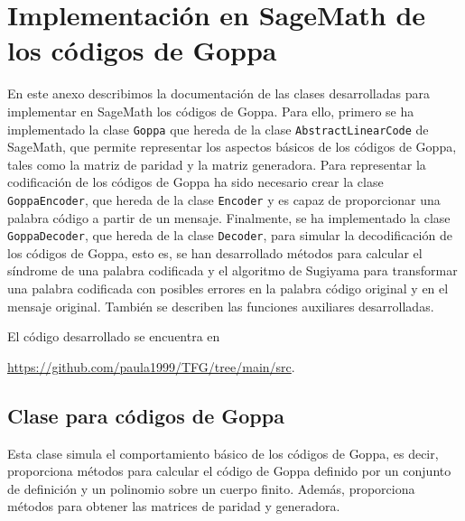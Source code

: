 \newpage
\null
\thispagestyle{empty}

\chapter[Implementación en SageMath de los códigos de Goppa]{Implementación en SageMath de los códigos de Goppa}
\label{annex:sage-Goppa}

En este anexo describimos la documentación de las clases desarrolladas para implementar en SageMath los códigos de Goppa. Para ello, primero se ha implementado la clase \texttt{Goppa} que hereda de la clase \texttt{AbstractLinearCode} de SageMath, que permite representar los aspectos básicos de los códigos de Goppa, tales como la matriz de paridad y la matriz generadora. Para representar la codificación de los códigos de Goppa ha sido necesario crear la clase \texttt{GoppaEncoder}, que hereda de la clase \texttt{Encoder} y es capaz de proporcionar una palabra código a partir de un mensaje. Finalmente, se ha implementado la clase \texttt{GoppaDecoder}, que hereda de la clase \texttt{Decoder}, para simular la decodificación de los códigos de Goppa, esto es, se han desarrollado métodos para calcular el síndrome de una palabra codificada y el algoritmo de Sugiyama para transformar una palabra codificada con posibles errores en la palabra código original y en el mensaje original. También se describen las funciones auxiliares desarrolladas.

El código desarrollado se encuentra en
\begin{center}
    \url{https://github.com/paula1999/TFG/tree/main/src}.
\end{center}

\section{Clase para códigos de Goppa}

Esta clase simula el comportamiento básico de los códigos de Goppa, es decir, proporciona métodos para calcular el código de Goppa definido por un conjunto de definición y un polinomio sobre un cuerpo finito. Además, proporciona métodos para obtener las matrices de paridad y generadora.

